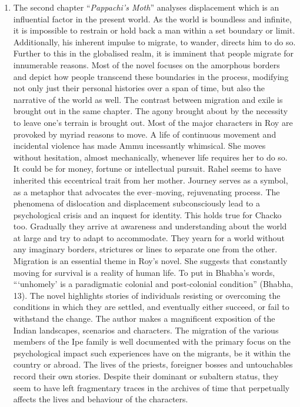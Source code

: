 \begin{enumerate}
  \item The second chapter “\emph{Pappachi’s Moth}” analyses displacement which is an influential factor in the present world.  As the world is boundless and infinite, it is impossible to restrain or hold back a man within a set boundary or limit.  Additionally, his inherent impulse to migrate, to wander, directs him to do so.  Further to this in the globalised realm, it is imminent that people migrate for innumerable reasons.   Most of the novel focuses on the amorphous borders and depict how people transcend these boundaries in the process, modifying not only just their personal histories over a span of time, but also the narrative of the world as well.   The contrast between migration and exile is brought out in the same chapter. The agony brought about by the necessity to leave one’s terrain is brought out.  Most of the major characters in Roy are provoked by myriad reasons to move.  A life of continuous movement and incidental violence has made Ammu incessantly whimsical.  She moves without hesitation, almost mechanically, whenever life requires her to do so. It could be for money, fortune or intellectual pursuit. Rahel seems to have inherited this eccentrical trait from her mother. Journey serves as a symbol, as a metaphor that advocates the ever–moving, rejuvenating process.   The phenomena of dislocation and displacement subconsciously lead to a psychological crisis and an inquest for identity.  This holds true for Chacko too. Gradually they arrive at awareness and understanding about the world at large and try to adapt to accommodate.  They yearn for a world without any imaginary borders, strictures or lines to separate one from the other.  Migration is an essential theme in Roy’s novel.  She suggests that constantly moving for survival is a reality of human life.  To put in Bhabha’s words, “‘unhomely’ is a paradigmatic colonial and post-colonial condition” (Bhabha, 13).  The novel highlights stories of individuals resisting or overcoming the conditions in which they are settled, and eventually either succeed, or fail to withstand the change.  The author makes a magnificent exposition of the Indian landscapes, scenarios and characters.  The migration of the various members of the Ipe family is well documented with the primary focus on the psychological impact such experiences have on the migrants, be it within the country or abroad.  The lives of the priests, foreigner bosses and untouchables record their own stories.  Despite their dominant or subaltern status, they seem to have left fragmentary traces in the archives of time that perpetually affects the lives and behaviour of the characters.


\end{enumerate}
